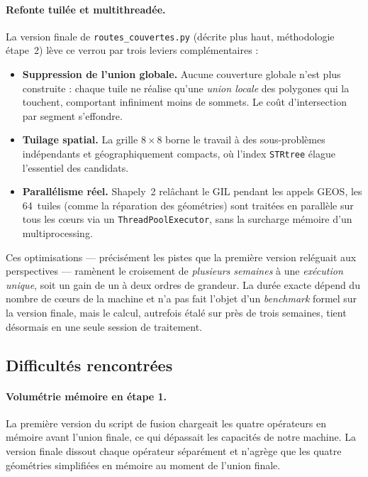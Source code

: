 \documentclass[11pt,a4paper]{article}
\begin{document}
\paragraph{Refonte tuilée et multithreadée.}
La version finale de \texttt{routes\_couvertes.py} (décrite plus haut, méthodologie étape~2) lève ce verrou par trois leviers complémentaires :
\begin{itemize}
  \item \textbf{Suppression de l'union globale.} Aucune couverture globale n'est plus construite : chaque tuile ne réalise qu'une \emph{union locale} des polygones qui la touchent, comportant infiniment moins de sommets. Le coût d'intersection par segment s'effondre.
  \item \textbf{Tuilage spatial.} La grille $8\times8$ borne le travail à des sous-problèmes indépendants et géographiquement compacts, où l'index \texttt{STRtree} élague l'essentiel des candidats.
  \item \textbf{Parallélisme réel.} Shapely~2 relâchant le GIL pendant les appels GEOS, les 64~tuiles (comme la réparation des géométries) sont traitées en parallèle sur tous les cœurs via un \texttt{ThreadPoolExecutor}, sans la surcharge mémoire d'un multiprocessing.
\end{itemize}
Ces optimisations — précisément les pistes que la première version reléguait aux perspectives — ramènent le croisement de \emph{plusieurs semaines} à une \emph{exécution unique}, soit un gain de un à deux ordres de grandeur. La durée exacte dépend du nombre de cœurs de la machine et n'a pas fait l'objet d'un \emph{benchmark} formel sur la version finale, mais le calcul, autrefois étalé sur près de trois semaines, tient désormais en une seule session de traitement.

\subsection{Difficultés rencontrées}

\paragraph{Volumétrie mémoire en étape 1.} La première version du script de fusion chargeait les quatre opérateurs en mémoire avant l'union finale, ce qui dépassait les capacités de notre machine. La version finale dissout chaque opérateur séparément et n'agrège que les quatre géométries simplifiées en mémoire au moment de l'union finale.
\end{document}
